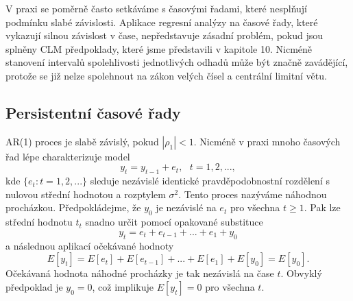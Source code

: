 V praxi se poměrně často setkáváme s časovými řadami, které nesplňují podmínku slabé závislosti. Aplikace regresní analýzy na časové řady, které vykazují silnou závislost v čase, nepředstavuje zásadní problém, pokud jsou splněny CLM předpoklady, které jsme představili v kapitole 10. Nicméně stanovení intervalů spolehlivosti jednotlivých odhadů může být značně zavádějící, protože se již nelze spolehnout na zákon velých čísel a centrální limitní větu.

\subsection{Persistentní časové řady}

AR(1) proces je slabě závislý, pokud $|\rho_1| < 1$. Nicméně v praxi mnoho časových řad lépe charakterizuje model
\begin{equation}
y_t = y_{t - 1} + e_t, ~~~ t = 1, 2, ...,
\end{equation}
kde $\{e_t: t = 1, 2, ...\}$ sleduje nezávislé identické pravděpodobnostní rozdělení s nulovou střední hodnotou a rozptylem $\sigma^2$. Tento proces nazýváme náhodnou procházkou. Předpokládejme, že $y_0$ je nezávislé na $e_t$ pro všechna $t \ge 1$. Pak lze střední hodnotu $t_t$ snadno určit pomocí opakované substituce
\begin{equation}
y_t = e_t + e_{t - 1} + ... + e_1 + y_0
\end{equation}
a následnou aplikací očekávané hodnoty
\begin{equation}
E[y_t] = E[e_t] + E[e_{t - 1}] + ... + E[e_1] + E[y_0] = E[y_0].
\end{equation}
Očekávaná hodnota náhodné procházky je tak nezávislá na čase $t$. Obvyklý předpoklad je $y_0 = 0$, což implikuje $E[y_t] = 0$ pro všechna $t$.

